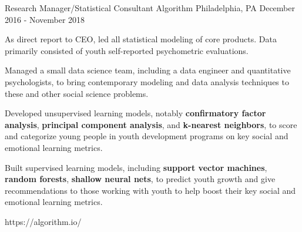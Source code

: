 \begin{cventries}
	\cventrylink
	{Research Manager/Statistical Consultant}
	{Algorithm}
	{Philadelphia, PA}
	{December 2016 - November 2018} %
	{ %
		\begin{cvitems}
			\item{As direct report to CEO, led all statistical modeling of core products. Data primarily consisted of youth self-reported psychometric evaluations.}
			\item{Managed a small data science team, including a data engineer and quantitative psychologists, to bring contemporary modeling and data analysis techniques to these and other social science problems.}
			\item{Developed unsupervised learning models, notably \textbf{confirmatory factor analysis}, \textbf{principal component analysis}, and \textbf{k-nearest neighbors}, to score and categorize young people in youth development programs on key social and emotional learning metrics.}
			\item{Built supervised learning models, including \textbf{support vector machines}, \textbf{random forests}, \textbf{shallow neural nets}, to predict youth growth and give recommendations to those working with youth to help boost their key social and emotional learning metrics.}
		\end{cvitems}
	}
	{https://algorithm.io/}

\end{cventries}
